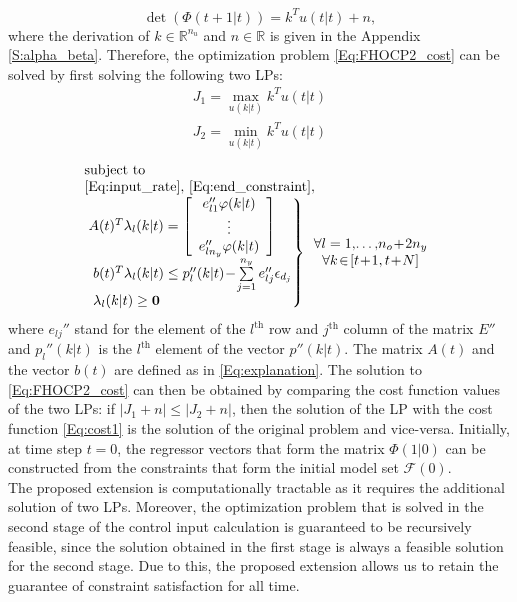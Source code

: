 \documentclass[10 pt, letterpaper]{article}
\newcommand{\beq}{\begin{equation}}
\newcommand{\eeq}{\end{equation}}
\newcommand{\bea}{\begin{eqnarray}}
\newcommand{\eea}{\end{eqnarray}}
\newcommand{\ba}{\begin{array}}
\newcommand{\ea}{\end{array}}
\newcommand{\bR}{{\mathbb R}}
\newtheorem{remark}{Remark}[section]
\begin{document}
\beq\label{Eq:linear_m}
\det\left(\Phi(t+1|t)\right)=k^T u(t|t)+n,
\eeq
where the derivation of $k \in \bR^{n_u}$ and $n \in \bR$ is given in the Appendix \ref{S:alpha_beta}. Therefore, the optimization problem \eqref{Eq:FHOCP2_cost} can be solved by first solving the following two LPs:
\bea\label{Eq:cost1}
J_1=\max \limits_{u(k|t)} k^T u(t|t)\\\label{Eq:cost2}
J_2=\min \limits_{u(k|t)} k^T u(t|t) \label{Eq:constraints}
\eea
\beq
\ba{l}
\text{subject to}\\
\eqref{Eq:input_rate}, \, \eqref{Eq:end_constraint},\\
\left.\ba{l}\!\!
A(t)^T\lambda_l(k|t)=\left[\ba{c}
e_{l1}''\varphi(k|t)\\
\vdots\\
e_{ln_y}''\varphi(k|t)
\ea\right]\\
b(t)^T\lambda_l(k|t)\leq p_l''(k|t)\!-\!\sum\limits_{j=1}^{n_y}e_{lj}''\epsilon_{d_j}\\
\lambda_l(k|t)\geq \bold 0
\ea\!\!\! \right\}\ba{cc}\forall l=1,\!\hdots,\!n_o\!+\!2n_y\\
\forall k\!\in\![t\!+\!1,t\!+\!N]\ea
\ea
\eeq
where $e_{lj}''$ stand for the element of the $l^\text{th}$ row and $j^\text{th}$ column of the matrix $E''$ and $p_l''(k|t)$ is the $l^\text{th}$ element of the vector $p''(k|t)$. The matrix $A(t)$ and the vector $b(t)$ are defined as in \eqref{Eq:explanation}. The solution to \eqref{Eq:FHOCP2_cost} can then be obtained by comparing the cost function values of the two LPs: if $|J_1+n|\leq |J_2+n|$, then the solution of the LP with the cost function \eqref{Eq:cost1} is the solution of the original problem and vice-versa. Initially, at time step $t=0$, the regressor vectors that form the matrix $\Phi(1|0)$ can be constructed from the constraints that form the initial model set $\mathcal{F}(0)$.\\
The proposed extension is computationally tractable as it requires the additional solution of two LPs. Moreover, the optimization problem that is solved in the second stage of the control input calculation is guaranteed to be recursively feasible, since the solution obtained in the first stage is always a feasible solution for the second stage. Due to this, the proposed extension allows us to retain the guarantee of constraint satisfaction for all time.  
\end{document}
